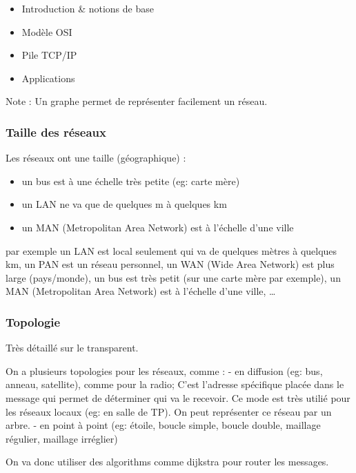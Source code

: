 \begin{itemize}
\tightlist
\item
  Introduction \& notions de base
\item
  Modèle OSI
\item
  Pile TCP/IP
\item
  Applications
\end{itemize}

Note : Un graphe permet de représenter facilement un réseau.

\hypertarget{taille-des-ruxe9seaux}{%
\subsubsection{Taille des réseaux}\label{taille-des-ruxe9seaux}}

Les réseaux ont une taille (géographique) :

\begin{itemize}
\tightlist
\item
  un bus est à une échelle très petite (eg: carte mère)
\item
  un LAN ne va que de quelques m à quelques km
\item
  un MAN (Metropolitan Area Network) est à l'échelle d'une ville
\end{itemize}

par exemple un LAN est local seulement qui va de quelques mètres à
quelques km, un PAN est un réseau personnel, un WAN (Wide Area Network)
est plus large (pays/monde), un bus est très petit (sur une carte mère
par exemple), un MAN (Metropolitan Area Network) est à l'échelle d'une
ville, \ldots{}

\hypertarget{topologie}{%
\subsubsection{Topologie}\label{topologie}}

Très détaillé sur le transparent.

On a plusieurs topologies pour les réseaux, comme : - en diffusion (eg:
bus, anneau, satellite), comme pour la radio; C'est l'adresse spécifique
placée dans le message qui permet de déterminer qui va le recevoir. Ce
mode est très utilié pour les réseaux locaux (eg: en salle de TP). On
peut représenter ce réseau par un arbre. - en point à point (eg: étoile,
boucle simple, boucle double, maillage régulier, maillage irréglier)

On va donc utiliser des algorithms comme dijkstra pour router les
messages.

